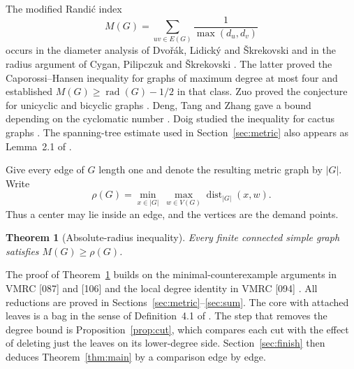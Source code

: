 \documentclass[11pt,a4paper]{article}
\newtheorem{theorem}{Theorem}[section]
\newcommand{\rad}{\operatorname{rad}}
\newcommand{\dist}{\operatorname{dist}}
\begin{document}
The modified Randi\'c index
\[
 M(G)=\sum_{uv\in E(G)}\frac1{\max(d_u,d_v)}
\]
occurs in the diameter analysis of Dvo\v{r}\'ak, Lidick\'y and
\v{S}krekovski \cite{DLS} and in the radius argument of Cygan, Pilipczuk
and \v{S}krekovski \cite{CPS}. The latter proved the Caporossi--Hansen
inequality for graphs of maximum degree at most four and established
$M(G)\ge\rad(G)-1/2$ in that class. Zuo proved the conjecture for
unicyclic and bicyclic graphs \cite{Zuo}. Deng, Tang and Zhang gave a
bound depending on the cyclomatic number \cite{Deng}. Doig studied the
inequality for cactus graphs \cite{Doig}. The spanning-tree estimate used
in Section~\ref{sec:metric} also appears as Lemma~2.1 of \cite{CPS}.

Give every edge of $G$ length one and denote the resulting metric graph
by $|G|$. Write
\[
 \rho(G)=\min_{x\in|G|}\ \max_{w\in V(G)}\dist_{|G|}(x,w).
\]
Thus a center may lie inside an edge, and the vertices are the demand points.
\begin{theorem}[Absolute-radius inequality]\label{thm:abs}
Every finite connected simple graph satisfies $M(G)\ge\rho(G)$.
\end{theorem}
The proof of Theorem~\ref{thm:abs} builds on the minimal-counterexample
arguments in VMRC [087] and [106] and the local degree identity in
VMRC [094] \cite{VMRC}. All reductions are proved in
Sections~\ref{sec:metric}--\ref{sec:sum}. The core with attached leaves
is a bag in the sense of Definition~4.1 of \cite{CPS}. The step that
removes the degree
bound is Proposition~\ref{prop:cut}, which compares each cut with the effect
of deleting just the leaves on its lower-degree side. Section~\ref{sec:finish}
then deduces Theorem~\ref{thm:main} by a comparison edge by edge.
\end{document}
